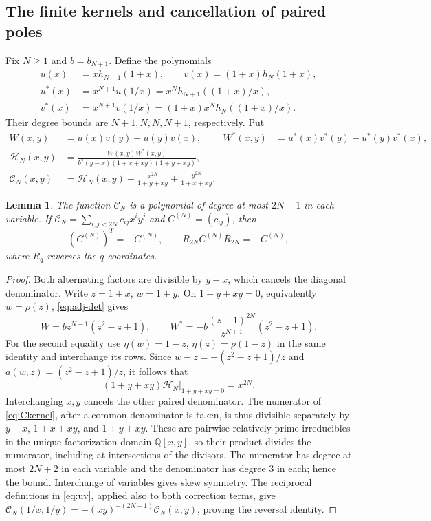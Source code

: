 \documentclass[11pt,a4paper]{amsart}
\newtheorem{lemma}[theorem]{Lemma}
\theoremstyle{remark}\newtheorem{remark}[theorem]{Remark}
\numberwithin{equation}{section}
\newcommand{\Q}{\mathbb Q}
\newcommand{\CC}{\mathscr C}
\newcommand{\HH}{\mathscr H}
\begin{document}
\subsection{The finite kernels and cancellation of paired poles}
Fix $N\ge1$ and $b=b_{N+1}$. Define the polynomials
\begin{equation}\label{eq:uv}
 \begin{split}
 u(x)&=xh_{N+1}(1+x),\qquad v(x)=(1+x)h_N(1+x),\\
 u^*(x)&=x^{N+1}u(1/x)=x^Nh_{N+1}((1+x)/x),\\
 v^*(x)&=x^{N+1}v(1/x)=(1+x)x^Nh_N((1+x)/x).
 \end{split}
\end{equation}
Their degree bounds are $N+1,N,N,N+1$, respectively. Put
\begin{align}
 W(x,y)&=u(x)v(y)-u(y)v(x),&W^*(x,y)&=u^*(x)v^*(y)-u^*(y)v^*(x),\nonumber\\
 \HH_N(x,y)&=\frac{W(x,y)W^*(x,y)}{b^2(y-x)(1+x+xy)(1+y+xy)},\nonumber\\
 \CC_N(x,y)&=\HH_N(x,y)-\frac{x^{2N}}{1+y+xy}+\frac{y^{2N}}{1+x+xy}.\label{eq:Ckernel}
\end{align}
\begin{lemma}\label{lem:ker1}
The function $\CC_N$ is a polynomial of degree at most $2N-1$ in each variable. If $\CC_N=\sum_{i,j<2N}c_{ij}x^iy^j$ and $C^{(N)}=(c_{ij})$, then
\begin{equation}\label{eq:Creflection}
 (C^{(N)})^T=-C^{(N)},\qquad R_{2N}C^{(N)}R_{2N}=-C^{(N)},
\end{equation}
where $R_q$ reverses the $q$ coordinates.
\end{lemma}
\begin{proof}
Both alternating factors are divisible by $y-x$, which cancels the diagonal denominator. Write $z=1+x$, $w=1+y$. On $1+y+xy=0$, equivalently $w=\rho(z)$, \eqref{eq:adj-det} gives
\[
 W=bz^{N-1}(z^2-z+1),\qquad
 W^*=-b\frac{(z-1)^{2N}}{z^{N+1}}(z^2-z+1).
\]
For the second equality use $\eta(w)=1-z$, $\eta(z)=\rho(1-z)$ in the same identity and interchange its rows. Since
$w-z=-(z^2-z+1)/z$ and $a(w,z)=(z^2-z+1)/z$, it follows that
\begin{equation}\label{eq:pair-cancel}
 \left.(1+y+xy)\HH_N\right|_{1+y+xy=0}=x^{2N}.
\end{equation}
Interchanging $x,y$ cancels the other paired denominator. The numerator of \eqref{eq:Ckernel}, after a common denominator is taken, is thus divisible separately by $y-x$, $1+x+xy$, and $1+y+xy$. These are pairwise relatively prime irreducibles in the unique factorization domain $\Q[x,y]$, so their product divides the numerator, including at intersections of the divisors. The numerator has degree at most $2N+2$ in each variable and the denominator has degree $3$ in each; hence the bound. Interchange of variables gives skew symmetry. The reciprocal definitions in \eqref{eq:uv}, applied also to both correction terms, give
$\CC_N(1/x,1/y)=-(xy)^{-(2N-1)}\CC_N(x,y)$, proving the reversal identity.
\end{proof}
\end{document}
